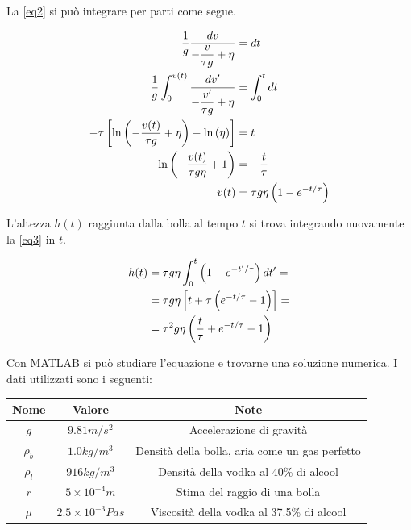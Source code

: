\documentclass{article}
\begin{document}
La \eqref{eq2} si può integrare per parti come segue.

\begin{align}\label{eq3}
    \frac{1}{g} \frac{dv}{-\dfrac{v}{\tau g} + \eta} &= dt\notag\\
    \frac{1}{g} \int_0^{v(t)}\frac{dv'}{-\dfrac{v'}{\tau g} + \eta} &= \int_0^t dt\notag\\
    -\tau \left[\ln{\left( -\frac{v(t)}{\tau g} + \eta \right) - \ln{\left( \eta \right)}}\right] &= t\notag\\
    \ln{\left( -\frac{v(t)}{\tau g \eta} + 1 \right)} &= - \frac{t}{\tau}\notag\\
    v(t) &= \tau g \eta \left( 1 - e^{-t/\tau} \right)
\end{align}

L'altezza $h(t)$ raggiunta dalla bolla al tempo $t$ si trova integrando nuovamente la \eqref{eq3} in $t$.

\begin{align}
    h(t) &= \tau g \eta \int_0^t \left( 1 - e^{-t'/\tau} \right) dt' =\notag\\
    &= \tau g \eta \left[ t + \tau \left(e ^ {-t/\tau} - 1\right) \right] =\notag\\
    &= \tau^2 g \eta \left(\frac{t}{\tau} + e^{-t/\tau} - 1\right)
\end{align}

\newpage

Con MATLAB si può studiare l'equazione e trovarne una soluzione numerica. I dati utilizzati sono i seguenti:

\begin{table}[h]
\centering
    \begin{tabular}{|c|c|c|}
        \hline
        Nome & Valore & Note \\
        \hline
        $g$ & $9.81 m/s^2$ & Accelerazione di gravità \\
        \hline
        $\rho_b$ & $1.0 kg/m^3$ & Densità della bolla, aria come un gas perfetto \\
        \hline
        $\rho_l$ & $916 kg/m^3$ & Densità della vodka al 40\% di alcool\\
        \hline
        $r$ & $5\times10^{-4}m$ & Stima del raggio di una bolla\\
        \hline
        $\mu$ & $2.5\times10^{-3}Pa s$ & Viscosità della vodka al 37.5\% di alcool\\
        \hline
    \end{tabular}
\end{table}
\end{document}
